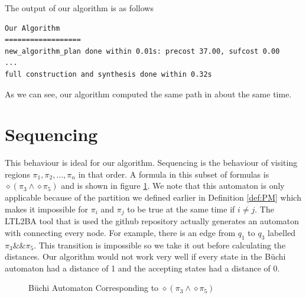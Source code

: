 The output of our algorithm is as follows
\begingroup
\fontsize{9pt}{12pt}\selectfont
\begin{lstlisting}
Our Algorithm
==================
new_algorithm_plan done within 0.01s: precost 37.00, sufcost 0.00
...
full construction and synthesis done within 0.32s 
\end{lstlisting}
\endgroup

As we can see, our algorithm computed the same path in about the same time.%
\section{Sequencing}
This behaviour is ideal for our algorithm. Sequencing is the behaviour of visiting regions $\pi_1,\pi_2,\dots,\pi_n$ in that order. A formula in this subset of formulas is $\diamond (\pi_3 \land  \diamond \pi_5)$ and is shown in figure \ref{fig:seq}. We note that this automaton is only applicable because of the partition we defined earlier in Definition \ref{def:PM} which makes it impossible for $\pi_i$ and $\pi_j$ to be true at the same time if $i\neq j$. The LTL2BA tool \cite{ltlbuchiwebsite} that is used the github repository \cite{pMasGit} actually generates an automaton with connecting every node. For example, there is an edge from $q_1$ to $q_3$ labelled $\pi_3 \&\& \pi_5 $. This transition is impossible so we take it out before calculating the distances. Our algorithm would not work very well if every state in the B\"uchi automaton had a distance of 1 and the accepting states had a distance of 0.


\begin{figure}
\centering
{}
\caption{B\"uchi Automaton Corresponding to $  \diamond(\pi_3 \land \diamond \pi_5)$}
\label{fig:seq}
\end{figure}

